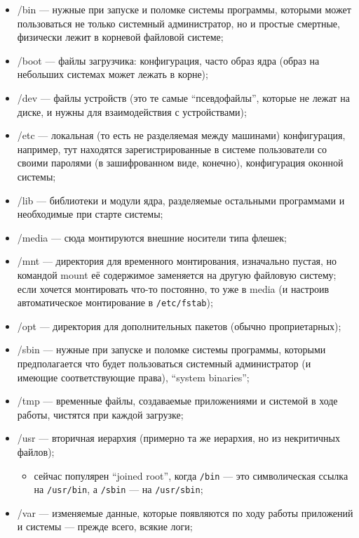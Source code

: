 \documentclass{../../text-style}
\begin{document}
\begin{itemize}
    \item /bin --- нужные при запуске и поломке системы программы, которыми может пользоваться не только системный администратор, но и простые смертные, физически лежит в корневой файловой системе;
    \item /boot --- файлы загрузчика: конфигурация, часто образ ядра (образ на небольших системах может лежать в корне);
    \item /dev --- файлы устройств (это те самые \enquote{псевдофайлы}, которые не лежат на диске, и нужны для взаимодействия с устройствами);
    \item /etc --- локальная (то есть не разделяемая между машинами) конфигурация, например, тут находятся зарегистрированные в системе пользователи со своими паролями (в зашифрованном виде, конечно), конфигурация оконной системы;
    \item /lib --- библиотеки и модули ядра, разделяемые остальными программами и необходимые при старте системы;
    \item /media --- сюда монтируются внешние носители типа флешек;
    \item /mnt --- директория для временного монтирования, изначально пустая, но командой mount её содержимое заменяется на другую файловую систему; если хочется монтировать что-то постоянно, то уже в media (и настроив автоматическое монтирование в \verb|/etc/fstab|);
    \item /opt --- директория для дополнительных пакетов (обычно проприетарных);
    \item /sbin --- нужные при запуске и поломке системы программы, которыми предполагается что будет пользоваться системный администратор (и имеющие соответствующие права), \enquote{system binaries};
    \item /tmp --- временные файлы, создаваемые приложениями и системой в ходе работы, чистятся при каждой загрузке;
    \item /usr --- вторичная иерархия (примерно та же иерархия, но из некритичных файлов);
    \begin{itemize}
        \item сейчас популярен \enquote{joined root}, когда \verb|/bin| --- это символическая ссылка на \verb|/usr/bin|, а \verb|/sbin| --- на \verb|/usr/sbin|;
    \end{itemize}
    \item /var --- изменяемые данные, которые появляются по ходу работы приложений и системы --- прежде всего, всякие логи;

\end{itemize}
\end{document}
